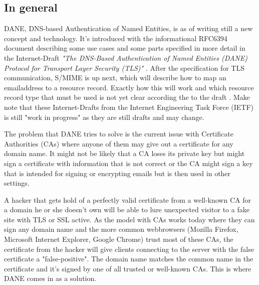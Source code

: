 \subsection{In general}
DANE, DNS-based Authentication of Named Entities, is as of writing still a new concept and technology.
It's introduced with the informational RFC6394 document \cite{rfc:6394} describing some use cases and some parts specified in more detail in the Internet-Draft \emph{"The DNS-Based Authentication of Named Entities (DANE) Protocol for Transport Layer Security (TLS)"} \cite{rfc:draft-dane}.
After the specification for TLS communication, S/MIME is up next, which will describe how to map an emailaddress to a resource record.
Exactly how this will work and which resource record type that must be used is not yet clear according the to the draft \cite{rfc:draft-smime}.
Make note that these Internet-Drafts from the Internet Engineering Task Force (IETF) is still "work in progress" as they are still drafts and may change.

The problem that DANE tries to solve is the current issue with Certificate Authorities (CAs) where anyone of them may give out a certificate for any domain name.
It might not be likely that a CA loses its private key but might sign a certificate with information that is not correct or the CA might sign a key that is intended for signing or encrypting emails but is then used in other settings.

A hacker that gets hold of a perfectly valid certificate from a well-known CA for a domain he or she doesn't own will be able to lure unexpected visitor to a fake site with TLS or SSL active.
As the model with CAs works today where they can sign any domain name and the more common webbrowsers (Mozilla Firefox, Microsoft Internet Explorer, Google Chrome) trust most of these CAs, the certificate from the hacker will give clients connecting to the server with the false certificate a "false-positive".
The domain name matches the common name in the certificate and it's signed by one of all trusted or well-known CAs.
This is where DANE comes in as a solution.


